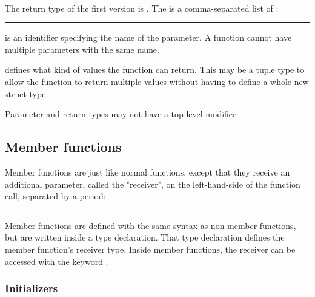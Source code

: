 \begin{grammar}
  \code{(}  \code{)} \code{\{}  \code{\}}\\
  \code{(}  \code{)} \code{->}  \code{\{}  \code{\}}
\end{grammar}

The return type of the first version is . The
 is a comma-separated list of
:

\begin{grammar}
\rule{parameter}  \code{:} 
\end{grammar}

 is an identifier specifying the name of the
parameter. A function cannot have multiple parameters with the same name.

 defines what kind of values the function can return.
This may be a tuple type to allow the function to return multiple values without
having to define a whole new struct type.

Parameter and return types may not have a top-level  modifier.

\subsection{Member functions}

Member functions are just like normal functions, except that they receive an
additional parameter, called the "receiver", on the left-hand-side of the
function call, separated by a period:

\begin{grammar}
\rule{member-function-call}    \code{(}  \code{)}
\end{grammar}

Member functions are defined with the same syntax as non-member functions, but
are written inside a type declaration. That type declaration defines the member
function's receiver type. Inside member functions, the receiver can be accessed
with the keyword .

\subsubsection{Initializers}


